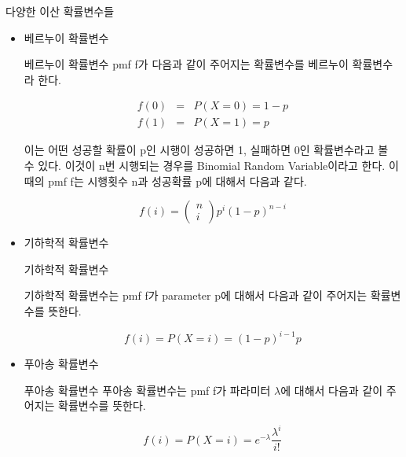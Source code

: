 \documentclass{beamer}
\begin{document}
\begin{frame}[allowframebreaks]{다양한 이산 확률변수들}

\begin{itemize} 

\item 베르누이 확률변수 
\begin{block}{베르누이 확률변수} 
pmf f가 다음과 같이 주어지는 확률변수를 베르누이 확률변수라 한다. 

\begin{eqnarray} 
f(0) &=& P(X=0) = 1-p \\ 
f(1)  &=& P(X=1) = p 
\end{eqnarray}

\end{block}

이는 어떤 성공할 확률이 p인 시행이 성공하면 1, 실패하면 0인 확률변수라고 볼 수 있다. 이것이 n번 시행되는 경우를 Binomial Random Variable이라고 한다. 이 때의 pmf f는 시행횟수 n과 성공확률 p에 대해서 다음과 같다. 

\begin{equation} 
f(i) = \left( \begin{matrix} n \\ i \end{matrix} \right) p^i (1-p)^{n-i} 
\end{equation}



\item 기하학적 확률변수

\begin{block}{기하학적 확률변수}

기하학적 확률변수는 pmf f가 parameter p에 대해서 다음과 같이 주어지는 확률변수를 뜻한다. 

\begin{equation} 
f(i) = P(X=i) = (1-p)^{i-1} p
\end{equation}

\end{block}


\item 푸아송 확률변수

\begin{block}{푸아송 확률변수}
푸아송 확률변수는 pmf f가 파라미터 $\lambda$에 대해서 다음과 같이 주어지는 확률변수를 뜻한다. 

\begin{equation} 
f(i) = P(X=i) = e^{-\lambda} \frac{\lambda^i}{i!}
\end{equation}
\end{block}

\end{itemize}

\end{frame}
\end{document}
